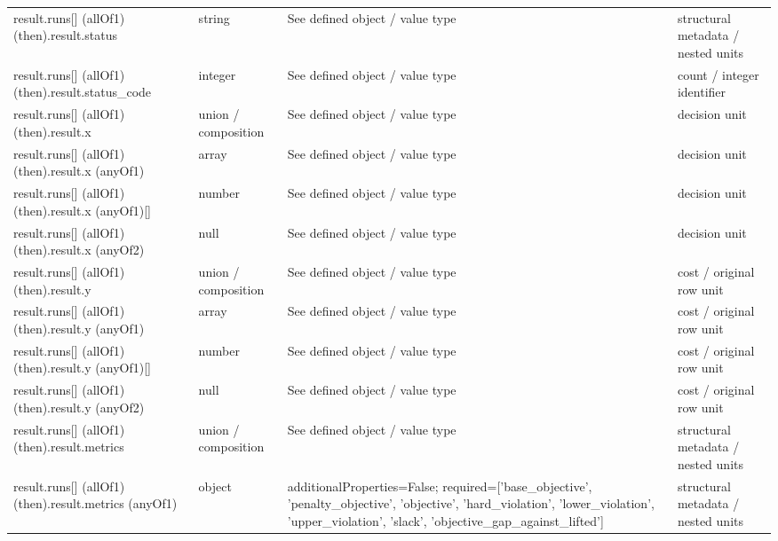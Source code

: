 \begin{longtable}{@{}>{\raggedright\arraybackslash}p{}>{\raggedright\arraybackslash}p{}>{\raggedright\arraybackslash}p{}>{\raggedright\arraybackslash}p{}@{}}
result.\allowbreak{}runs[] (allOf1) (then).\allowbreak{}result.\allowbreak{}status & string & See defined object /\allowbreak{} value type & structural metadata /\allowbreak{} nested units\\
result.\allowbreak{}runs[] (allOf1) (then).\allowbreak{}result.\allowbreak{}status\_\allowbreak{}code & integer & See defined object /\allowbreak{} value type & count /\allowbreak{} integer identifier\\
result.\allowbreak{}runs[] (allOf1) (then).\allowbreak{}result.\allowbreak{}x & union /\allowbreak{} composition & See defined object /\allowbreak{} value type & decision unit\\
result.\allowbreak{}runs[] (allOf1) (then).\allowbreak{}result.\allowbreak{}x (anyOf1) & array & See defined object /\allowbreak{} value type & decision unit\\
result.\allowbreak{}runs[] (allOf1) (then).\allowbreak{}result.\allowbreak{}x (anyOf1)[] & number & See defined object /\allowbreak{} value type & decision unit\\
result.\allowbreak{}runs[] (allOf1) (then).\allowbreak{}result.\allowbreak{}x (anyOf2) & null & See defined object /\allowbreak{} value type & decision unit\\
result.\allowbreak{}runs[] (allOf1) (then).\allowbreak{}result.\allowbreak{}y & union /\allowbreak{} composition & See defined object /\allowbreak{} value type & cost /\allowbreak{} original row unit\\
result.\allowbreak{}runs[] (allOf1) (then).\allowbreak{}result.\allowbreak{}y (anyOf1) & array & See defined object /\allowbreak{} value type & cost /\allowbreak{} original row unit\\
result.\allowbreak{}runs[] (allOf1) (then).\allowbreak{}result.\allowbreak{}y (anyOf1)[] & number & See defined object /\allowbreak{} value type & cost /\allowbreak{} original row unit\\
result.\allowbreak{}runs[] (allOf1) (then).\allowbreak{}result.\allowbreak{}y (anyOf2) & null & See defined object /\allowbreak{} value type & cost /\allowbreak{} original row unit\\
result.\allowbreak{}runs[] (allOf1) (then).\allowbreak{}result.\allowbreak{}metrics & union /\allowbreak{} composition & See defined object /\allowbreak{} value type & structural metadata /\allowbreak{} nested units\\
result.\allowbreak{}runs[] (allOf1) (then).\allowbreak{}result.\allowbreak{}metrics (anyOf1) & object & additionalProperties=\allowbreak{}False; required=\allowbreak{}['base\_\allowbreak{}objective', 'penalty\_\allowbreak{}objective', 'objective', 'hard\_\allowbreak{}violation', 'lower\_\allowbreak{}violation', 'upper\_\allowbreak{}violation', 'slack', 'objective\_\allowbreak{}gap\_\allowbreak{}against\_\allowbreak{}lifted'] & structural metadata /\allowbreak{} nested units\\

\end{longtable}
